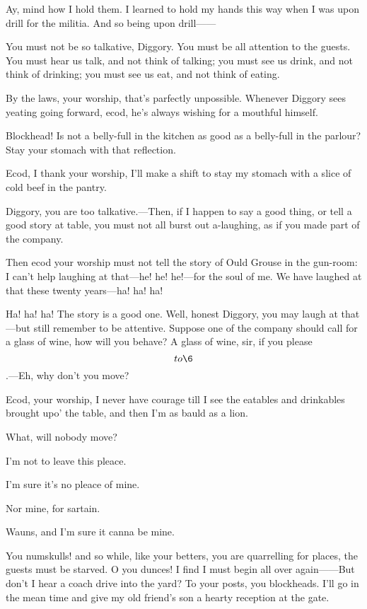 \documentclass{book}
\begin{document}
\6  Ay, mind how I hold them.  I learned to hold my hands this
way when I was upon drill for the militia.  And so being upon drill------

\3  You must not be so talkative, Diggory.  You must be all
attention to the guests.  You must hear us talk, and not think of
talking; you must see us drink, and not think of drinking; you must see
us eat, and not think of eating.

\6  By the laws, your worship, that's parfectly unpossible. 
Whenever Diggory sees yeating going forward, ecod, he's always wishing
for a mouthful himself.

\3  Blockhead!  Is not a belly-full in the kitchen as good as
a belly-full in the parlour?  Stay your stomach with that reflection.

\6  Ecod, I thank your worship, I'll make a shift to stay my
stomach with a slice of cold beef in the pantry.

\3  Diggory, you are too talkative.---Then, if I happen to say
a good thing, or tell a good story at table, you must not all burst out
a-laughing, as if you made part of the company.

\6  Then ecod your worship must not tell the story of Ould
Grouse in the gun-room: I can't help laughing at that---he! he!
he!---for the soul of me.  We have laughed at that these twenty
years---ha! ha! ha!

\3  Ha! ha! ha!  The story is a good one.  Well, honest
Diggory, you may laugh at that---but still remember to be attentive. 
Suppose one of the company should call for a glass of wine, how will
you behave?  A glass of wine, sir, if you please \[to \6\].---Eh, why
don't you move?

\6  Ecod, your worship, I never have courage till I see the
eatables and drinkables brought upo' the table, and then I'm as bauld
as a lion.

\3  What, will nobody move?

  I'm not to leave this pleace.

  I'm sure it's no pleace of mine.

  Nor mine, for sartain.

\6  Wauns, and I'm sure it canna be mine.

\3  You numskulls! and so while, like your betters, you are
quarrelling for places, the guests must be starved.  O you dunces!  I
find I must begin all over again------But don't I hear a coach drive into
the yard?  To your posts, you blockheads.  I'll go in the mean time and
give my old friend's son a hearty reception at the gate.
\end{document}
